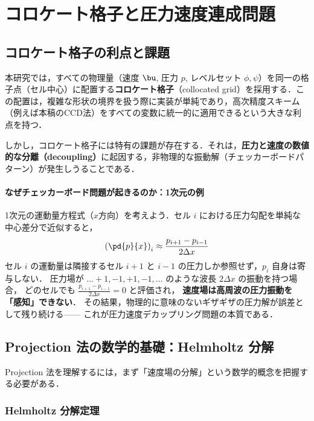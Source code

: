\section{コロケート格子と圧力速度連成問題}
\label{sec:collocate}

\subsection{コロケート格子の利点と課題}
本研究では，すべての物理量（速度 $\bu$, 圧力 $p$, レベルセット $\phi, \psi$）を同一の格子点（セル中心）に配置する\textbf{コロケート格子}（collocated grid）を採用する．この配置は，複雑な形状の境界を扱う際に実装が単純であり，高次精度スキーム（例えば本稿のCCD法）をすべての変数に統一的に適用できるという大きな利点を持つ．

しかし，コロケート格子には特有の課題が存在する．それは，\textbf{圧力と速度の数値的な分離（decoupling）}に起因する，非物理的な振動解（チェッカーボードパターン）が発生しうることである．

\paragraph{なぜチェッカーボード問題が起きるのか：1次元の例}

1次元の運動量方程式（$x$方向）を考えよう．セル $i$ における圧力勾配を単純な中心差分で近似すると，
\[ \left(\pd{p}{x}\right)_i \approx \frac{p_{i+1} - p_{i-1}}{2\Delta x} \]
セル $i$ の運動量は隣接するセル $i+1$ と $i-1$ の圧力しか参照せず，$p_i$ 自身は寄与しない．
圧力場が $\ldots +1, -1, +1, -1, \ldots$ のような波長 $2\Delta x$ の振動を持つ場合，
どのセルでも $\frac{p_{i+1}-p_{i-1}}{2\Delta x} = 0$ と評価され，
\textbf{速度場は高周波の圧力振動を「感知」できない}．
その結果，物理的に意味のないギザギザの圧力解が誤差として残り続ける——
これが圧力速度デカップリング問題の本質である．

\subsection{Projection 法の数学的基礎：Helmholtz 分解}
\label{sec:helmholtz}

Projection 法を理解するには，まず「速度場の分解」という数学的概念を把握する必要がある．

\subsubsection{Helmholtz 分解定理}

